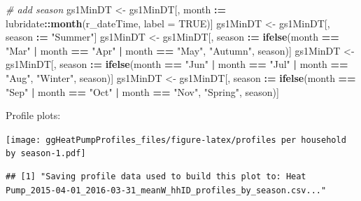 \documentclass[]{article}
\newenvironment{Shaded}{\begin{snugshade}}{\end{snugshade}}
\newcommand{\KeywordTok}[1]{\textcolor[rgb]{0.13,0.29,0.53}{\textbf{#1}}}
\newcommand{\DataTypeTok}[1]{\textcolor[rgb]{0.13,0.29,0.53}{#1}}
\newcommand{\StringTok}[1]{\textcolor[rgb]{0.31,0.60,0.02}{#1}}
\newcommand{\CommentTok}[1]{\textcolor[rgb]{0.56,0.35,0.01}{\textit{#1}}}
\newcommand{\OtherTok}[1]{\textcolor[rgb]{0.56,0.35,0.01}{#1}}
\newcommand{\OperatorTok}[1]{\textcolor[rgb]{0.81,0.36,0.00}{\textbf{#1}}}
\newcommand{\ErrorTok}[1]{\textcolor[rgb]{0.64,0.00,0.00}{\textbf{#1}}}
\newcommand{\NormalTok}[1]{#1}
\begin{document}
\begin{Shaded}
\begin{Highlighting}[]
\CommentTok{# add season}
\NormalTok{gs1MinDT <-}\StringTok{ }\NormalTok{gs1MinDT[, month }\OperatorTok{:}\ErrorTok{=}\StringTok{ }\NormalTok{lubridate}\OperatorTok{::}\KeywordTok{month}\NormalTok{(r_dateTime, }\DataTypeTok{label =} \OtherTok{TRUE}\NormalTok{)]}
\NormalTok{gs1MinDT <-}\StringTok{ }\NormalTok{gs1MinDT[, season }\OperatorTok{:}\ErrorTok{=}\StringTok{ "Summer"}\NormalTok{]}
\NormalTok{gs1MinDT <-}\StringTok{ }\NormalTok{gs1MinDT[, season }\OperatorTok{:}\ErrorTok{=}\StringTok{ }\KeywordTok{ifelse}\NormalTok{(month }\OperatorTok{==}\StringTok{ "Mar"} \OperatorTok{|}
\StringTok{                                              }\NormalTok{month }\OperatorTok{==}\StringTok{ "Apr"} \OperatorTok{|}
\StringTok{                                              }\NormalTok{month }\OperatorTok{==}\StringTok{ "May"}\NormalTok{, }\StringTok{"Autumn"}\NormalTok{, season)]}
\NormalTok{gs1MinDT <-}\StringTok{ }\NormalTok{gs1MinDT[, season }\OperatorTok{:}\ErrorTok{=}\StringTok{ }\KeywordTok{ifelse}\NormalTok{(month }\OperatorTok{==}\StringTok{ "Jun"} \OperatorTok{|}
\StringTok{                                              }\NormalTok{month }\OperatorTok{==}\StringTok{ "Jul"} \OperatorTok{|}
\StringTok{                                              }\NormalTok{month }\OperatorTok{==}\StringTok{ "Aug"}\NormalTok{, }\StringTok{"Winter"}\NormalTok{, season)]}
\NormalTok{gs1MinDT <-}\StringTok{ }\NormalTok{gs1MinDT[, season }\OperatorTok{:}\ErrorTok{=}\StringTok{ }\KeywordTok{ifelse}\NormalTok{(month }\OperatorTok{==}\StringTok{ "Sep"} \OperatorTok{|}
\StringTok{                                              }\NormalTok{month }\OperatorTok{==}\StringTok{ "Oct"} \OperatorTok{|}
\StringTok{                                              }\NormalTok{month }\OperatorTok{==}\StringTok{ "Nov"}\NormalTok{, }\StringTok{"Spring"}\NormalTok{, season)]}
\end{Highlighting}
\end{Shaded}

Profile plots:

\texttt{[image: ggHeatPumpProfiles\_files/figure-latex/profiles per household by season-1.pdf]}

\begin{verbatim}
## [1] "Saving profile data used to build this plot to: Heat Pump_2015-04-01_2016-03-31_meanW_hhID_profiles_by_season.csv..."
\end{verbatim}
\end{document}
